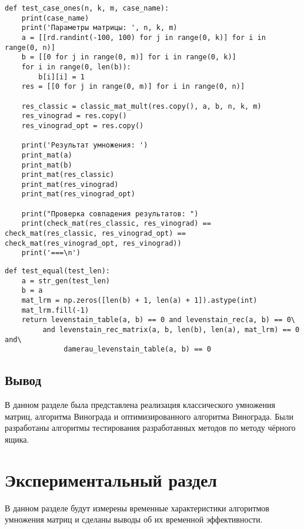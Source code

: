 \begin{lstlisting}[label=some-code-8,caption=Реализация для случая единичной матрицы]
def test_case_ones(n, k, m, case_name):
    print(case_name)
    print('Параметры матрицы: ', n, k, m)
    a = [[rd.randint(-100, 100) for j in range(0, k)] for i in range(0, n)]
    b = [[0 for j in range(0, m)] for i in range(0, k)]
    for i in range(0, len(b)):
        b[i][i] = 1
    res = [[0 for j in range(0, m)] for i in range(0, n)]

    res_classic = classic_mat_mult(res.copy(), a, b, n, k, m)
    res_vinograd = res.copy()
    res_vinograd_opt = res.copy()

    print('Результат умножения: ')
    print_mat(a)
    print_mat(b)
    print_mat(res_classic)
    print_mat(res_vinograd)
    print_mat(res_vinograd_opt)

    print("Проверка совпадения результатов: ")
    print(check_mat(res_classic, res_vinograd) == check_mat(res_classic, res_vinograd_opt) == check_mat(res_vinograd_opt, res_vinograd))
    print('===\n')     
\end{lstlisting}

\begin{lstlisting}[label=some-code-9,caption=Реализация тестирования строк равной ненулевой длины.]
def test_equal(test_len):
    a = str_gen(test_len)
    b = a
    mat_lrm = np.zeros([len(b) + 1, len(a) + 1]).astype(int)
    mat_lrm.fill(-1)
    return levenstain_table(a, b) == 0 and levenstain_rec(a, b) == 0\
         and levenstain_rec_matrix(a, b, len(b), len(a), mat_lrm) == 0 and\
              damerau_levenstain_table(a, b) == 0
\end{lstlisting}

\section{Вывод}
В данном разделе была представлена реализация классического умножения матриц, алгоритма Винограда и оптимизированного алгоритма Винограда. Были разработаны алгоритмы тестирования разработанных методов по методу чёрного ящика.

\chapter{Экспериментальный раздел}

В данном разделе будут измерены временные характеристики алгоритмов умножения матриц и сделаны выводы об их временной эффективности.

